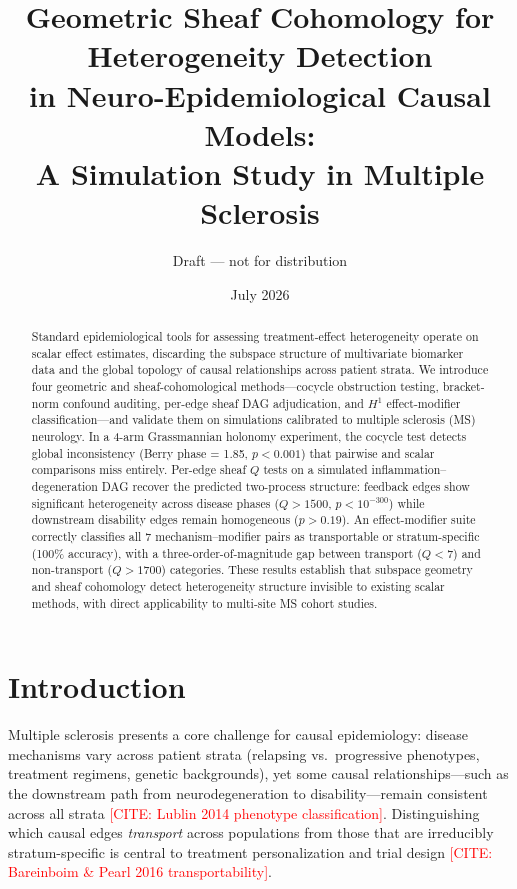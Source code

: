 \documentclass[11pt]{article}
\title{Geometric Sheaf Cohomology for Heterogeneity Detection\\in Neuro-Epidemiological Causal Models:\\A Simulation Study in Multiple Sclerosis}
\author{Draft --- not for distribution}
\date{July 2026}
\newcommand{\misscite}[1]{\textcolor{red}{[CITE: #1]}}
\begin{document}
\maketitle

\begin{abstract}
Standard epidemiological tools for assessing treatment-effect heterogeneity
operate on scalar effect estimates, discarding the subspace structure of
multivariate biomarker data and the global topology of causal relationships
across patient strata. We introduce four geometric and sheaf-cohomological
methods---cocycle obstruction testing, bracket-norm confound auditing,
per-edge sheaf DAG adjudication, and $H^1$ effect-modifier
classification---and validate them on simulations calibrated to multiple
sclerosis (MS) neurology. In a 4-arm Grassmannian holonomy experiment, the
cocycle test detects global inconsistency (Berry phase = 1.85, $p < 0.001$)
that pairwise and scalar comparisons miss entirely. Per-edge sheaf $Q$ tests
on a simulated inflammation--degeneration DAG recover the predicted
two-process structure: feedback edges show significant heterogeneity across
disease phases ($Q > 1500$, $p < 10^{-300}$) while downstream disability
edges remain homogeneous ($p > 0.19$). An effect-modifier suite correctly
classifies all 7 mechanism--modifier pairs as transportable or
stratum-specific (100\% accuracy), with a three-order-of-magnitude gap
between transport ($Q < 7$) and non-transport ($Q > 1700$) categories. These
results establish that subspace geometry and sheaf cohomology detect
heterogeneity structure invisible to existing scalar methods, with direct
applicability to multi-site MS cohort studies.
\end{abstract}

\section{Introduction}

Multiple sclerosis presents a core challenge for causal epidemiology:
disease mechanisms vary across patient strata (relapsing vs.\ progressive
phenotypes, treatment regimens, genetic backgrounds), yet some causal
relationships---such as the downstream path from neurodegeneration to
disability---remain consistent across all strata
\misscite{Lublin 2014 phenotype classification}.
Distinguishing which causal edges \emph{transport} across populations from
those that are irreducibly stratum-specific is central to treatment
personalization and trial design
\misscite{Bareinboim \& Pearl 2016 transportability}.
\end{document}
